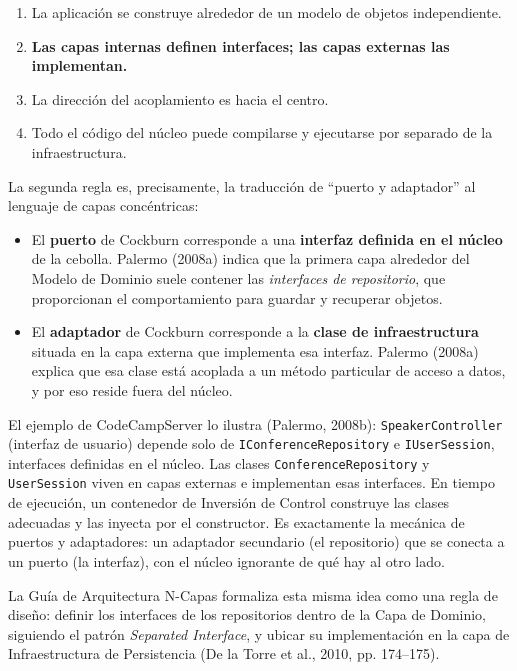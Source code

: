 \documentclass[11pt,a4paper]{article}
\begin{document}
\begin{enumerate}[leftmargin=1.5em]
  \item La aplicación se construye alrededor de un modelo de objetos independiente.
  \item \textbf{Las capas internas definen interfaces; las capas externas las implementan.}
  \item La dirección del acoplamiento es hacia el centro.
  \item Todo el código del núcleo puede compilarse y ejecutarse por separado de la infraestructura.
\end{enumerate}

La segunda regla es, precisamente, la traducción de ``puerto y adaptador'' al lenguaje de capas concéntricas:

\begin{itemize}[leftmargin=1.5em]
  \item El \textbf{puerto} de Cockburn corresponde a una \textbf{interfaz definida en el núcleo} de la cebolla. Palermo (2008a) indica que la primera capa alrededor del Modelo de Dominio suele contener las \emph{interfaces de repositorio}, que proporcionan el comportamiento para guardar y recuperar objetos.
  \item El \textbf{adaptador} de Cockburn corresponde a la \textbf{clase de infraestructura} situada en la capa externa que implementa esa interfaz. Palermo (2008a) explica que esa clase está acoplada a un método particular de acceso a datos, y por eso reside fuera del núcleo.
\end{itemize}

El ejemplo de CodeCampServer lo ilustra (Palermo, 2008b): \texttt{SpeakerController} (interfaz de usuario) depende solo de \texttt{IConferenceRepository} e \texttt{IUserSession}, interfaces definidas en el núcleo. Las clases \texttt{ConferenceRepository} y \texttt{UserSession} viven en capas externas e implementan esas interfaces. En tiempo de ejecución, un contenedor de Inversión de Control construye las clases adecuadas y las inyecta por el constructor. Es exactamente la mecánica de puertos y adaptadores: un adaptador secundario (el repositorio) que se conecta a un puerto (la interfaz), con el núcleo ignorante de qué hay al otro lado.

La Guía de Arquitectura N-Capas formaliza esta misma idea como una regla de diseño: definir los interfaces de los repositorios dentro de la Capa de Dominio, siguiendo el patrón \emph{Separated Interface}, y ubicar su implementación en la capa de Infraestructura de Persistencia (De la Torre et al., 2010, pp. 174--175).
\end{document}
